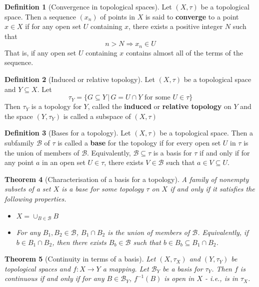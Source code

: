 \documentclass[10pt, oneside, reqno]{amsart}
\theoremstyle{plain}%
\newtheorem{thm}{Theorem}[section]
\theoremstyle{definition}
\newtheorem{defn}[thm]{Definition}
\theoremstyle{remark}
\newcommand{\topo}{(X,\tau)}
\begin{document}
\begin{defn}[Convergence in topological spaces]
    Let $\topo$ be a topological space.  Then a sequence $(x_n)$ of points in $X$ is said to \textbf{converge} to a point $x \in X$ if for any open set $U$ containing $x$, there exists a positive integer $N$ such that \[
        n > N \Rightarrow x_n \in U
    \]
    That is, if any open set $U$ containing $x$ contains almost all of the terms of the sequence.
\end{defn}

\begin{defn}[Induced or relative topology]
        Let $\topo$ be a topological space and $Y \subseteq X$. Let \[
            \tau_Y = \{ G \subseteq Y \, | \, G = U \cap Y \text{ for some $U \in \tau$} \}
        \]
    Then $\tau_Y$ is a topology for $Y$, called the \textbf{induced} or \textbf{relative topology} on $Y$ and the space $(Y, \tau_Y)$ is called a subspace of $\topo$
\end{defn}

\begin{defn}[Bases for a topology]
    Let $\topo$ be a topological space.  Then a subfamily $\mathcal{B}$ of $\tau$ is called a \textbf{base} for the topology if for every open set $U$ in $\tau$ is the union of members of $\mathcal{B}$.  Equivalently, $\mathcal{B} \subseteq \tau$ is a basis for $\tau$ if and only if for any point $a$ in an open set $U \in \tau$, there exists $V \in \mathcal{B}$ such that $a \in V \subseteq U$.
\end{defn}

\begin{thm}[Characterisation of a basis for a topology]
    A family of nonempty subsets of a set $X$ is a base for some topology $\tau$ on $X$ if and only if it satisfies the following properties.
    \begin{itemize}
        \item $X = \cup_{B \in \mathcal{B}} B$
        \item For any $B_1, B_2 \in \mathcal{B}$, $B_1 \cap B_2$ is the union of members of $\mathcal{B}$.  Equivalently, if $b \in B_1 \cap B_2$, then there exists $B_b \in \mathcal{B}$ such that $b \in B_b \subseteq B_1 \cap B_2$.
    \end{itemize}
\end{thm}

\begin{thm}[Continuity in terms of a basis]
    Let $(X, \tau_X)$ and $(Y, \tau_Y)$ be topological spaces and $f : X \rightarrow Y$ a mapping.  Let $\mathcal{B}_Y$ be a basis for $\tau_Y$.  Then $f$ is continuous if and only if for any $B \in \mathcal{B}_Y$, $f^{-1}(B)$ is open in $X$ - i.e., is in $\tau_X$.
\end{thm}
\end{document}
